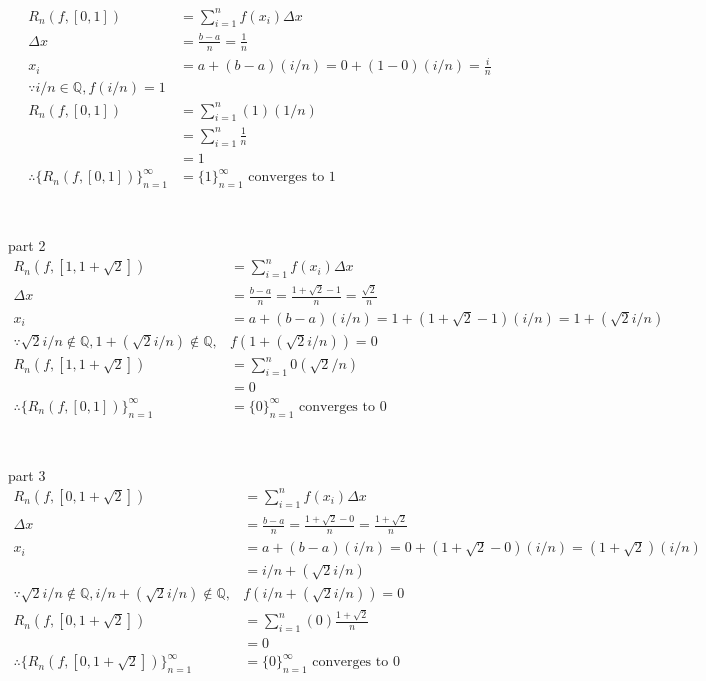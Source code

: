 \documentclass[12pt, border = 4pt, multi]{article} %
\begin{document}
\begin{align*}
R_n(f, [0, 1]) &= \sum_{i = 1} ^ n f(x_i) \Delta x\\
\Delta x &= \frac{b - a}{n} = \frac{1}{n}\\
x_i &= a + (b - a)(i / n) = 0 + (1 - 0)(i / n) = \frac{i}{n}\\
\because i / n \in \mathbb{Q}, f(i / n) = 1\\
R_n(f, [0, 1]) &= \sum_{i = 1} ^ n (1)(1 / n)\\
&= \sum_{i = 1} ^ n \frac{1}{n}\\
&= 1\\
\therefore \{R_n(f, [0, 1])\}_{n = 1} ^ {\infty} &= \{1\}_{n = 1} ^ {\infty} \text{ converges to 1}\\
\end{align*}
\\
\\
part 2
\begin{align*}
R_n(f, [1, 1 + \sqrt{2}]) &= \sum_{i = 1} ^ n f(x_i) \Delta x\\
\Delta x &= \frac{b - a}{n} = \frac{1 + \sqrt{2} - 1}{n} = \frac{\sqrt{2}}{n}\\
x_i &= a + (b - a)(i / n) = 1 + (1 + \sqrt{2} - 1)(i / n) = 1 + (\sqrt{2}i / n)\\
\because \sqrt{2}i / n \not\in \mathbb{Q}, 1 + (\sqrt{2}i / n) \not\in \mathbb{Q}, &f(1 + (\sqrt{2}i / n)) = 0\\
R_n(f, [1, 1 + \sqrt{2}]) &= \sum_{i = 1} ^ n 0 (\sqrt{2} / n)\\
&= 0\\
\therefore \{R_n(f, [0, 1])\}_{n = 1} ^ {\infty} &= \{0\}_{n = 1} ^ {\infty} \text{ converges to 0}\\
\end{align*}
\\
\\
part 3
\begin{align*}
R_n(f, [0, 1 + \sqrt{2}]) &= \sum_{i = 1} ^ n f(x_i) \Delta x\\
\Delta x &= \frac{b - a}{n} = \frac{1 + \sqrt{2} - 0}{n} = \frac{1 + \sqrt{2}}{n}\\
x_i &= a + (b - a)(i / n) = 0 + (1 + \sqrt{2} - 0)(i / n) = (1 + \sqrt{2})(i / n)\\
&= i / n + (\sqrt{2}i / n)\\
\because \sqrt{2}i / n \not\in \mathbb{Q}, i / n + (\sqrt{2}i / n) \not\in \mathbb{Q}, &f(i / n + (\sqrt{2}i / n)) = 0\\
R_n(f, [0, 1 + \sqrt{2}]) &= \sum_{i = 1} ^ n (0) \frac{1 + \sqrt{2}}{n}\\
&= 0\\
\therefore \{R_n(f, [0, 1 + \sqrt{2}])\}_{n = 1} ^ {\infty} &= \{0\}_{n = 1} ^ {\infty} \text{ converges to 0}\\
\end{align*}
\end{document}
